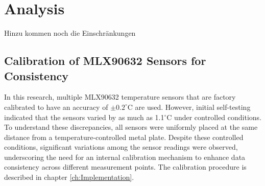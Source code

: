
\chapter{Analysis}
\label{ch:Analysis}

Hinzu kommen noch die Einschränkungen

\section{Calibration of MLX90632 Sensors for Consistency}
In this research, multiple MLX90632 temperature sensors that are factory calibrated to have an accuracy of $\pm0.2^\circ$C are used. 
However, initial self-testing indicated that the sensors varied by as much as 1.1$^\circ$C under controlled conditions. 
To understand these discrepancies, all sensors were uniformly placed at the same distance from a temperature-controlled metal plate. 
Despite these controlled conditions, significant variations among the sensor readings were observed, underscoring the need for an internal calibration mechanism to enhance data consistency across different measurement points.
The calibration procedure is described in chapter \ref{ch:Implementation}.

